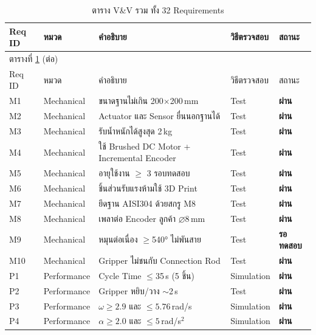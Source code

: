 \begin{longtable}{llp{5cm}ll}
    \caption{ตาราง V\&V รวม ทั้ง 32 Requirements} \label{tab:vv_all} \\
    \toprule
    Req ID & หมวด & คำอธิบาย & วิธีตรวจสอบ & สถานะ \\
    \midrule
    \endfirsthead
    
    \multicolumn{5}{l}{ตารางที่ \ref{tab:vv_all} (ต่อ)} \\
    \toprule
    Req ID & หมวด & คำอธิบาย & วิธีตรวจสอบ & สถานะ \\
    \midrule
    \endhead
    
    \bottomrule
    \endfoot
    
    M1  & Mechanical & ขนาดฐานไม่เกิน 200$\times$200\,mm          & Test    & \textbf{ผ่าน} \\
    M2  & Mechanical & Actuator และ Sensor ยื่นนอกฐานได้          & Test    & \textbf{ผ่าน} \\
    M3  & Mechanical & รับน้ำหนักได้สูงสุด 2\,kg                  & Test    & \textbf{ผ่าน} \\
    M4  & Mechanical & ใช้ Brushed DC Motor + Incremental Encoder & Test    & \textbf{ผ่าน} \\
    M5  & Mechanical & อายุใช้งาน $\geq$ 3 รอบทดสอบ              & Test    & \textbf{ผ่าน} \\
    M6  & Mechanical & ชิ้นส่วนรับแรงห้ามใช้ 3D Print             & Test    & \textbf{ผ่าน} \\
    M7  & Mechanical & ยึดฐาน AISI304 ด้วยสกรู M8                 & Test    & \textbf{ผ่าน} \\
    M8  & Mechanical & เพลาต่อ Encoder ลูกค้า $\diameter$8\,mm    & Test    & \textbf{ผ่าน} \\
    M9  & Mechanical & หมุนต่อเนื่อง $\geq$540° ไม่พันสาย        & Test    & \textbf{รอทดสอบ} \\
    M10 & Mechanical & Gripper ไม่ชนกับ Connection Rod            & Test    & \textbf{ผ่าน} \\
    \midrule
    P1  & Performance & Cycle Time $\leq$35\,s (5 ชิ้น)           & Simulation & \textbf{ผ่าน} \\
    P2  & Performance & Gripper หยิบ/วาง $\sim$2\,s               & Test       & \textbf{ผ่าน} \\
    P3  & Performance & $\omega \geq 2.9$ และ $\leq 5.76$\,rad/s  & Simulation & \textbf{ผ่าน} \\
    P4  & Performance & $\alpha \geq 2.0$ และ $\leq 5$\,rad/s$^2$ & Simulation & \textbf{ผ่าน} \\

\end{longtable}
